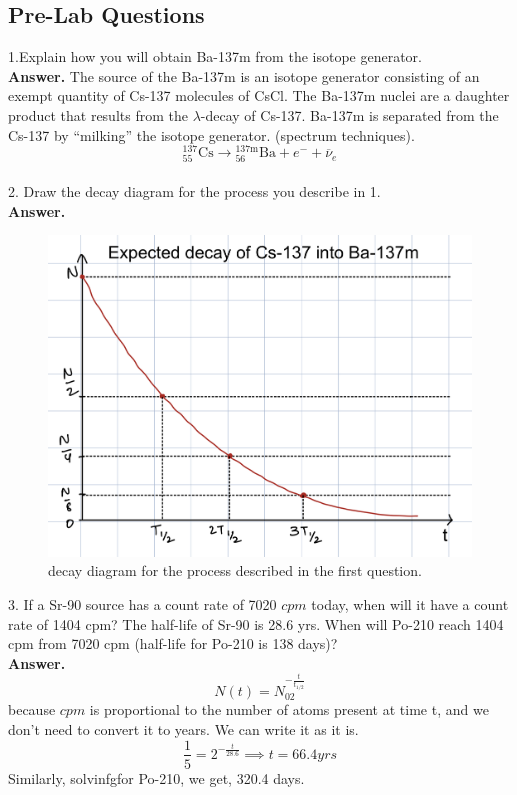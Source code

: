 \documentclass[twocolumn]{article}
\begin{document}
\subsection*{Pre-Lab Questions}
1.Explain how you will obtain Ba-137m from the isotope generator.\\
\textbf{Answer.} The source of the Ba-137m is an isotope generator consisting of an exempt quantity of Cs-137 molecules of CsCl. The Ba-137m nuclei are a daughter product that results from the $\lambda$-decay of Cs-137. Ba-137m is separated from the Cs-137 by “milking” the isotope generator.  (spectrum techniques).
\begin{equation*}
{}^{137}_{55}\mathrm{Cs} \rightarrow {}^{137\mathrm{m}}_{56}\mathrm{Ba} + e^{-} + \overline{\nu}_e
\end{equation*}
\\
2. Draw the decay diagram for the process you describe in 1.\\
\textbf{Answer.}
\begin{center}
\begin{figure}[h!]
\includegraphics[scale=0.35]{lab13.png}
\caption{\small{decay diagram for the process described in the first question.}}
\end{figure}
\end{center}
3. If a Sr-90 source has a count rate of 7020 $cpm$ today, when will it have a count rate
of 1404 cpm? The half-life of Sr-90 is 28.6 yrs. When will Po-210 reach 1404 cpm
from 7020 cpm (half-life for Po-210 is 138 days)?\\
\textbf{Answer.}
\begin{equation*}
N(t)=N_02^{-\frac{t}{t_{1/2}}}
\end{equation*}
because $cpm$ is proportional to the number of atoms present at time t, and we don't need to convert it to years. We can write it as it is.
\begin{equation*}
\frac{1}{5}=2^{-\frac{t}{28.6}}\implies t=66.4 yrs
\end{equation*}
Similarly, solvinfgfor Po-210, we get, 320.4 days.\\
\end{document}
